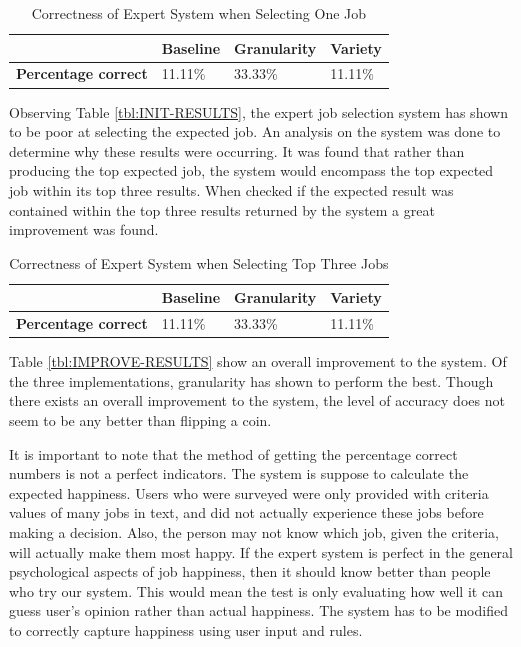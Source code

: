 \documentclass[12pt,fleqn,reqno,letterpaper]{article}
\begin{document}
\begin{table}[h]
  \caption{Correctness of Expert System when Selecting One Job}
    \label{tbl:INIT_RESULTS}
    \centering
\begin{tabular}{|l|l|l|l|}
\hline
                            & \textbf{Baseline} & \textbf{Granularity} & \textbf{Variety} \\ \hline
\textbf{Percentage correct} & 11.11\%           & 33.33\%              & 11.11\%          \\ \hline
\end{tabular}
\end{table}

Observing Table \ref{tbl:INIT-RESULTS}, the expert job selection system has shown to be poor at selecting the expected job.  An analysis on the system was done to determine why these results were occurring.  It was found that rather than producing the top expected job, the system would encompass the top expected job within its top three results.  When checked if the expected result was contained within the top three results returned by the system a great improvement was found.

\begin{table}[h]
  \caption{Correctness of Expert System when Selecting Top Three Jobs}
    \label{tbl:IMPROVe_RESULTS}
    \centering
\begin{tabular}{|l|l|l|l|}
\hline
                            & \textbf{Baseline} & \textbf{Granularity} & \textbf{Variety} \\ \hline
\textbf{Percentage correct} & 11.11\%           & 33.33\%              & 11.11\%          \\ \hline
\end{tabular}
\end{table}

Table \ref{tbl:IMPROVE-RESULTS} show an overall improvement to the system.  Of the three implementations, granularity has shown to perform the best.  Though there exists an overall improvement to the system, the level of accuracy does not seem to be any better than  flipping a coin.

It is important to note that the method of getting the percentage correct numbers is not a perfect indicators. The system is suppose to calculate the expected happiness. Users who were surveyed were only provided with criteria values of many jobs in text, and did not actually experience these jobs before making a decision. Also, the person may not know which job, given the criteria, will actually make them most happy. If the expert system is perfect in the general psychological aspects of job happiness, then it should know better than people who try our system. This would mean the test is only evaluating how well it can guess user’s opinion rather than actual happiness. The system has to be modified to correctly capture happiness using user input and rules.
\end{document}
